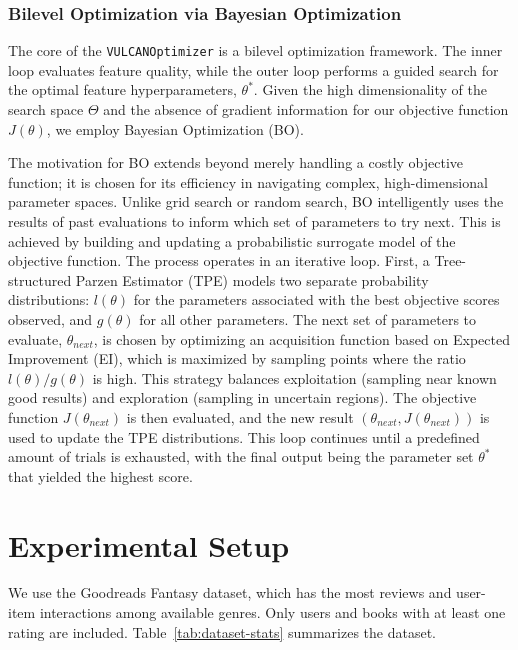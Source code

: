 \subsubsection{Bilevel Optimization via Bayesian Optimization}

The core of the \texttt{VULCANOptimizer} is a bilevel optimization framework. The inner loop evaluates feature quality, while the outer loop performs a guided search for the optimal feature hyperparameters, $\theta^*$. Given the high dimensionality of the search space $\Theta$ and the absence of gradient information for our objective function $J(\theta)$, we employ Bayesian Optimization (BO).

The motivation for BO extends beyond merely handling a costly objective function; it is chosen for its efficiency in navigating complex, high-dimensional parameter spaces. Unlike grid search or random search, BO intelligently uses the results of past evaluations to inform which set of parameters to try next. This is achieved by building and updating a probabilistic surrogate model of the objective function. The process operates in an iterative loop. First, a Tree-structured Parzen Estimator (TPE) models two separate probability distributions: $l(\theta)$ for the parameters associated with the best objective scores observed, and $g(\theta)$ for all other parameters. The next set of parameters to evaluate, $\theta_{next}$, is chosen by optimizing an acquisition function based on Expected Improvement (EI), which is maximized by sampling points where the ratio $l(\theta)/g(\theta)$ is high. This strategy balances exploitation (sampling near known good results) and exploration (sampling in uncertain regions). The objective function $J(\theta_{next})$ is then evaluated, and the new result $(\theta_{next}, J(\theta_{next}))$ is used to update the TPE distributions. This loop continues until a predefined amount of trials is exhausted, with the final output being the parameter set $\theta^*$ that yielded the highest score.

\section{Experimental Setup}
\label{sec:experimental-setup}

We use the Goodreads Fantasy dataset, which has the most reviews and user-item interactions among available genres. Only users and books with at least one rating are included. Table~\ref{tab:dataset-stats} summarizes the dataset.


